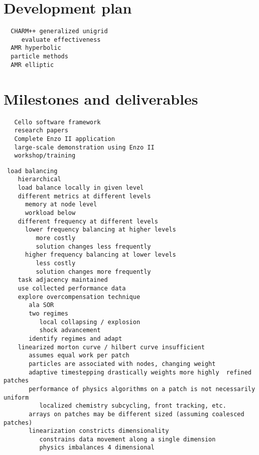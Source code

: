 \documentclass[14pt,letter]{article}
\begin{document}
\section{Development plan} \label{s:plan} 

\begin{verbatim}
  CHARM++ generalized unigrid
     evaluate effectiveness
  AMR hyperbolic
  particle methods
  AMR elliptic
\end{verbatim}

\section{Milestones and deliverables} \label{s:milestones}

\begin{verbatim}
   Cello software framework
   research papers
   Complete Enzo II application
   large-scale demonstration using Enzo II
   workshop/training
\end{verbatim}




\begin{verbatim}
 load balancing
    hierarchical
    load balance locally in given level
    different metrics at different levels
      memory at node level
      workload below
    different frequency at different levels
      lower frequency balancing at higher levels
         more costly
         solution changes less frequently
      higher frequency balancing at lower levels
         less costly
         solution changes more frequently
    task adjacency maintained
    use collected performance data
    explore overcompensation technique
       ala SOR
       two regimes
          local collapsing / explosion
          shock advancement
       identify regimes and adapt
    linearized morton curve / hilbert curve insufficient
       assumes equal work per patch
       particles are associated with nodes, changing weight
       adaptive timestepping drastically weights more highly  refined patches
       performance of physics algorithms on a patch is not necessarily uniform
          localized chemistry subcycling, front tracking, etc.
       arrays on patches may be different sized (assuming coalesced patches)
       linearization constricts dimensionality
          constrains data movement along a single dimension
          physics imbalances 4 dimensional
\end{verbatim}
\end{document}
